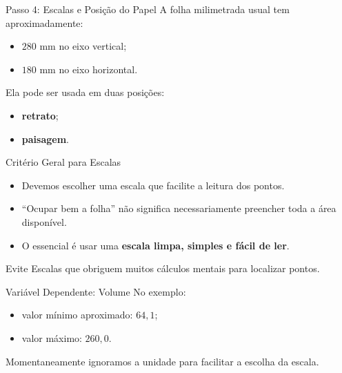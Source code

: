 \documentclass[aspectratio=169]{beamer}
\begin{document}
\begin{frame}{Passo 4: Escalas e Posição do Papel}
A folha milimetrada usual tem aproximadamente:

\begin{itemize}
\item \(280\) mm no eixo vertical;
\item \(180\) mm no eixo horizontal.
\end{itemize}

Ela pode ser usada em duas posições:

\begin{itemize}
\item \textbf{retrato};
\item \textbf{paisagem}.
\end{itemize}
\end{frame}

\begin{frame}{Critério Geral para Escalas}
\begin{itemize}
\item Devemos escolher uma escala que facilite a leitura dos pontos.
\item ``Ocupar bem a folha'' não significa necessariamente preencher toda a área disponível.
\item O essencial é usar uma \textbf{escala limpa, simples e fácil de ler}.
\end{itemize}

\begin{alertblock}{Evite}
Escalas que obriguem muitos cálculos mentais para localizar pontos.
\end{alertblock}
\end{frame}

\begin{frame}{Variável Dependente: Volume}
No exemplo:

\begin{itemize}
\item valor mínimo aproximado: \(64{,}1\);
\item valor máximo: \(260{,}0\).
\end{itemize}

Momentaneamente ignoramos a unidade para facilitar a escolha da escala.
\end{frame}
\end{document}
